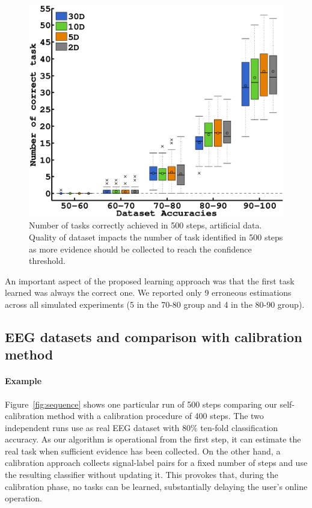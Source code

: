 \begin{figure}[!ht]
    \centering
    \includegraphics[width=\columnwidth]{img/plots_aaai/plot_artificial_nCorrect.eps}
    \caption{Number of tasks correctly achieved in 500 steps, artificial data. Quality of dataset impacts the number of task identified in 500 steps as more evidence should be collected to reach the confidence threshold.}
    \label{fig:nCorrectArtificial}
\end{figure} 

An important aspect of the proposed learning approach was that the first task learned was always the correct one. We reported only 9 erroneous estimations across all simulated experiments (5 in the 70-80 group and 4 in the 80-90 group).

\subsection{EEG datasets and comparison with calibration method}

\paragraph{Example}
Figure~\ref{fig:sequence} shows one particular run of 500 steps comparing our self-calibration method with a calibration procedure of 400 steps. The two independent runs use as real EEG dataset with $80\%$ ten-fold classification accuracy. As our algorithm is operational from the first step, it can estimate the real task when sufficient evidence has been collected. On the other hand, a calibration approach collects signal-label pairs for a fixed number of steps and use the resulting classifier without updating it. This provokes that, during the calibration phase, no tasks can be learned, substantially delaying the user's online operation.

